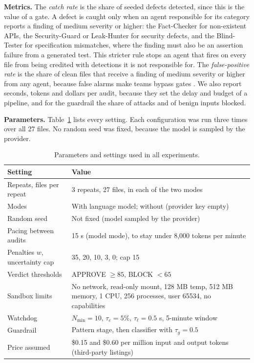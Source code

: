 \documentclass[12pt,onecolumn,draftclsnofoot]{IEEEtran}
\begin{document}
\textbf{Metrics.} The \emph{catch rate} is the share of seeded defects detected, since this is the value of a gate. A defect is caught only when an agent responsible for its category reports a finding of medium severity or higher: the Fact-Checker for non-existent APIs, the Security-Guard or Leak-Hunter for security defects, and the Blind-Tester for specification mismatches, where the finding must also be an assertion failure from a generated test. This stricter rule stops an agent that fires on every file from being credited with detections it is not responsible for. The \emph{false-positive rate} is the share of clean files that receive a finding of medium severity or higher from any agent, because false alarms make teams bypass gates \cite{johnson2013}. We also report seconds, tokens and dollars per audit, because they set the delay and budget of a pipeline, and for the guardrail the share of attacks and of benign inputs blocked.

\textbf{Parameters.} Table~\ref{tab:params} lists every setting. Each configuration was run three times over all 27 files. No random seed was fixed, because the model is sampled by the provider.
\begin{table}[htbp]\centering
\caption{Parameters and settings used in all experiments.}
\label{tab:params}\small
\begin{tabular}{@{}p{.34\linewidth}p{.58\linewidth}@{}}\toprule
Setting & Value\\\midrule
Repeats, files per repeat & 3 repeats, 27 files, in each of the two modes\\
Modes & With language model; without (provider key empty)\\
Random seed & Not fixed (model sampled by the provider)\\
Pacing between audits & 15 s (model mode), to stay under 8,000 tokens per minute\\
Penalties $w$, uncertainty cap & 35, 20, 10, 3, 0; cap 15\\
Verdict thresholds & APPROVE $\ge 85$, BLOCK $<65$\\
Sandbox limits & No network, read-only mount, 128 MB temp, 512 MB memory, 1 CPU, 256 processes, user 65534, no capabilities\\
Watchdog & $N_{\min}=10$, $\tau_e=5\%$, $\tau_\ell=0.5$ s, 5-minute window\\
Guardrail & Pattern stage, then classifier with $\tau_g=0.5$\\
Price assumed & \$0.15 and \$0.60 per million input and output tokens (third-party listings)\\
\bottomrule\end{tabular}
\end{table}
\end{document}
